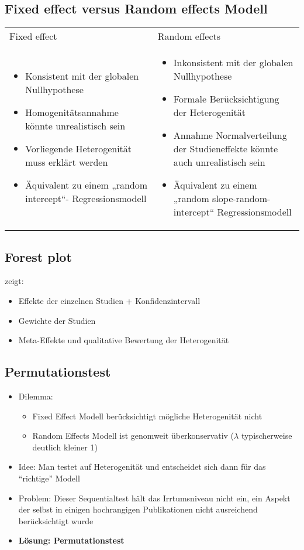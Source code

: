 \newpage
\subsection{Fixed effect versus Random effects Modell}
\begin{tabular}{p{}p{}}
	Fixed effect & Random effects\\
	\begin{itemize}
	\item Konsistent mit der globalen Nullhypothese
	\item Homogenitätsannahme könnte unrealistisch sein
	\item Vorliegende Heterogenität muss erklärt werden
	\item Äquivalent zu einem „random intercept“- Regressionsmodell
\end{itemize} & 
\begin{itemize}
	\item Inkonsistent mit der globalen Nullhypothese
	\item Formale Berücksichtigung der Heterogenität
	\item Annahme Normalverteilung der Studieneffekte könnte auch unrealistisch sein
	\item Äquivalent zu einem „random slope-random-intercept“ Regressionsmodell
\end{itemize}\\
\end{tabular}

\subsection{Forest plot}
zeigt:
\begin{itemize}
	\item Effekte der einzelnen Studien + Konfidenzintervall
	\item Gewichte der Studien
	\item Meta-Effekte und qualitative Bewertung der Heterogenität
\end{itemize}

\newpage
\subsection{Permutationstest}
\begin{itemize}
	\item Dilemma:
	\begin{itemize}
		\item Fixed Effect Modell berücksichtigt mögliche Heterogenität nicht
		\item Random Effects Modell ist genomweit überkonservativ ($\lambda$
typischerweise deutlich kleiner 1)
	\end{itemize}
	\item Idee: Man testet auf Heterogenität und entscheidet sich dann für das “richtige” Modell
	\item Problem: Dieser Sequentialtest hält das Irrtumsniveau nicht ein, ein Aspekt der selbst in einigen hochrangigen Publikationen nicht ausreichend berücksichtigt wurde
	\item \textbf{Lösung: Permutationstest}
\end{itemize}

